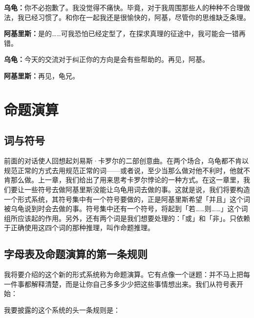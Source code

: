 \documentclass[
  12pt,
  twoside,
  openright,
  oldfontcommands,
]{memoir}
\newcommand{\dialogname}[1]{{\heifamily\bfseries #1}}
\begin{document}
\dialogname{乌龟：}你不必抱歉了。我没觉得不痛快。毕竟，对于我周围那些人的种种不合理做法，我已经习惯了。和你在一起我还是很愉快的，阿基，尽管你的思维缺乏条理。

\dialogname{阿基里斯：}是的\ldots\ldots 可我恐怕已经定型了，在探求真理的征途中，我可能会一错再错。

\dialogname{乌龟：}今天的交流对于纠正你的方向是会有些帮助的。再见，阿基。

\dialogname{阿基里斯：}再见，龟兄。

\label{Chapter07.xhtml}{}

\chapter{命题演算}

\section{词与符号}

前面的对话使人回想起刘易斯·卡罗尔的二部创意曲。在两个场合，乌龟都不肯以规范正常的方式去用规范正常的词------或者说，至少当那么做对他不利时，他就不肯那么做。上一章，我们给出了用来思考卡罗尔悖论的一种方式。在这一章里，我们要让一些符号去做阿基里斯没能让乌龟用词去做的事。这就是说，我们将要构造一个形式系统，其符号集中有一个符号要做的，正是阿基里斯希望「并且」这个词被乌龟说到时会去做的事。符号集中还有一个符号，将起到「若\ldots\ldots 则\ldots\ldots」这个词组所应该起的作用。另外，还有两个词是我们想要处理的：「或」和「非」。只依赖于正确使用这四个词的那种推理，叫作命题推理。

\section{字母表及命题演算的第一条规则}

我将要介绍的这个新的形式系统称为命题演算。它有点像一个谜题：并不马上把每一件事都解释清楚，而是让你自己多多少少把这些事情想出来。我们从符号表开始：


我要披露的这个系统的头一条规则是：
\end{document}
